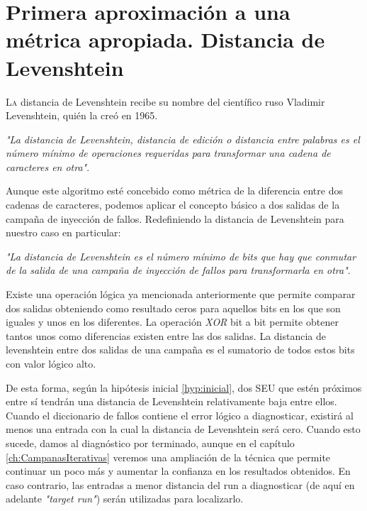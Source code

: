 \chapter{Primera aproximación a una métrica apropiada. Distancia de Levenshtein}
\label{ch:Levenshtein}

\lettrine[lraise=-0.1, lines=2, loversize=0.2]{L}{a} distancia de Levenshtein
recibe su nombre del científico ruso Vladimir Levenshtein, quién la creó en 1965.

\vspace{0.3cm}
\textit{"La distancia de Levenshtein, distancia de edición o distancia entre
palabras es el número mínimo de operaciones requeridas para transformar una cadena
de caracteres en otra"}.
\vspace{-0.2cm}
{}
\vspace{0.3cm}

Aunque este algoritmo esté concebido como métrica de la diferencia entre dos
cadenas de caracteres, podemos aplicar el concepto básico a dos salidas de la
campaña de inyección de fallos. Redefiniendo la distancia de Levenshtein para
nuestro caso en particular:

\vspace{0.3cm}
\textit{"La distancia de Levenshtein es el número mínimo de bits que hay que
conmutar de la salida de una campaña de inyección de fallos para transformarla 
en otra"}.
\vspace{0.3cm}

Existe una operación lógica ya mencionada anteriormente que permite comparar dos
salidas obteniendo como resultado ceros para aquellos bits en los que son iguales
y unos en los diferentes. La operación \textit{XOR} bit a bit permite obtener
tantos unos como diferencias existen entre las dos salidas. La distancia de
levenshtein entre dos salidas de una campaña es el sumatorio de todos estos bits 
con valor lógico alto.

De esta forma, según la hipótesis inicial \ref{hyp:inicial}, dos \gls{SEU}
que estén próximos entre sí tendrán una distancia de Levenshtein relativamente
baja entre ellos. Cuando el diccionario de fallos contiene el error lógico a
diagnosticar, existirá al menos una entrada con la cual la distancia de
Levenshtein será cero. Cuando esto sucede, damos al diagnóstico por terminado,
aunque en el capítulo \ref{ch:CampanasIterativas} veremos una ampliación de la 
técnica que permite continuar un poco más y aumentar la confianza en los 
resultados obtenidos. En caso contrario, las entradas a menor distancia del run a
diagnosticar (de aquí en adelante \textit{"target run"}) serán utilizadas para
localizarlo.


